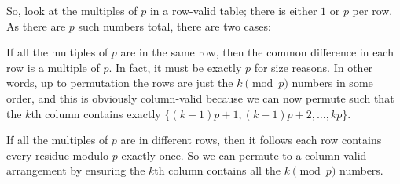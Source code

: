 \documentclass[11pt]{scrartcl}
\begin{document}
So, look at the multiples of $p$ in a row-valid table;
there is either $1$ or $p$ per row.
As there are $p$ such numbers total, there are two cases:
\begin{itemize}
  \ii If all the multiples of $p$ are in the same row,
  then the common difference in each row is a multiple of $p$.
  In fact, it must be exactly $p$ for size reasons.
  In other words, up to permutation the rows are just
  the $k \pmod p$ numbers in some order, and this is obviously column-valid
  because we can now permute such that the $k$th column
  contains exactly $\{(k-1)p+1, (k-1)p+2, \dots, kp\}$.

  \ii If all the multiples of $p$ are in different rows,
  then it follows each row contains every residue modulo $p$ exactly once.
  So we can permute to a column-valid arrangement by ensuring
  the $k$th column contains all the $k \pmod p$ numbers.
\end{itemize}
\end{document}
